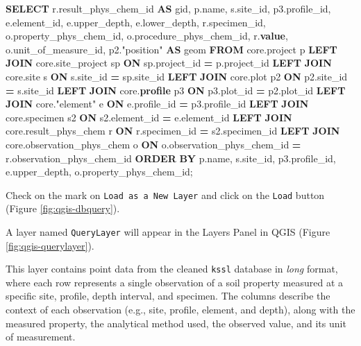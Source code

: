 \documentclass[
  10pt,
  b5paper,
  oneside]{book}
\newenvironment{Shaded}{\begin{snugshade}}{\end{snugshade}}
\newcommand{\FunctionTok}[1]{\textcolor[rgb]{0.13,0.29,0.53}{\textbf{#1}}}
\newcommand{\KeywordTok}[1]{\textcolor[rgb]{0.13,0.29,0.53}{\textbf{#1}}}
\newcommand{\NormalTok}[1]{#1}
\newcommand{\OperatorTok}[1]{\textcolor[rgb]{0.81,0.36,0.00}{\textbf{#1}}}
\newcommand{\OtherTok}[1]{\textcolor[rgb]{0.56,0.35,0.01}{#1}}
\begin{document}
\begin{Shaded}
\begin{Highlighting}[]
\KeywordTok{SELECT} 
\NormalTok{  r.result\_phys\_chem\_id }\KeywordTok{AS}\NormalTok{ gid,}
\NormalTok{  p.name,}
\NormalTok{  s.site\_id,}
\NormalTok{  p3.profile\_id, }
\NormalTok{  e.element\_id,}
\NormalTok{  e.upper\_depth,}
\NormalTok{  e.lower\_depth,}
\NormalTok{  r.specimen\_id,}
\NormalTok{  o.property\_phys\_chem\_id,}
\NormalTok{  o.procedure\_phys\_chem\_id,}
\NormalTok{  r.}\FunctionTok{value}\NormalTok{,}
\NormalTok{  o.unit\_of\_measure\_id,}
\NormalTok{  p2.}\OtherTok{"position"} \KeywordTok{AS}\NormalTok{ geom}
\KeywordTok{FROM}\NormalTok{ core.project p}
\KeywordTok{LEFT} \KeywordTok{JOIN}\NormalTok{ core.site\_project sp }\KeywordTok{ON}\NormalTok{ sp.project\_id }\OperatorTok{=}\NormalTok{ p.project\_id}
\KeywordTok{LEFT} \KeywordTok{JOIN}\NormalTok{ core.site s }\KeywordTok{ON}\NormalTok{ s.site\_id }\OperatorTok{=}\NormalTok{ sp.site\_id}
\KeywordTok{LEFT} \KeywordTok{JOIN}\NormalTok{ core.plot p2 }\KeywordTok{ON}\NormalTok{ p2.site\_id }\OperatorTok{=}\NormalTok{ s.site\_id}
\KeywordTok{LEFT} \KeywordTok{JOIN}\NormalTok{ core.}\KeywordTok{profile}\NormalTok{ p3 }\KeywordTok{ON}\NormalTok{ p3.plot\_id }\OperatorTok{=}\NormalTok{ p2.plot\_id}
\KeywordTok{LEFT} \KeywordTok{JOIN}\NormalTok{ core.}\OtherTok{"element"}\NormalTok{ e }\KeywordTok{ON}\NormalTok{ e.profile\_id }\OperatorTok{=}\NormalTok{ p3.profile\_id}
\KeywordTok{LEFT} \KeywordTok{JOIN}\NormalTok{ core.specimen s2 }\KeywordTok{ON}\NormalTok{ s2.element\_id }\OperatorTok{=}\NormalTok{ e.element\_id}
\KeywordTok{LEFT} \KeywordTok{JOIN}\NormalTok{ core.result\_phys\_chem r }\KeywordTok{ON}\NormalTok{ r.specimen\_id }\OperatorTok{=}\NormalTok{ s2.specimen\_id}
\KeywordTok{LEFT} \KeywordTok{JOIN}\NormalTok{ core.observation\_phys\_chem o }\KeywordTok{ON}\NormalTok{ o.observation\_phys\_chem\_id }\OperatorTok{=}\NormalTok{ r.observation\_phys\_chem\_id}
\KeywordTok{ORDER} \KeywordTok{BY}\NormalTok{ p.name, s.site\_id, p3.profile\_id, e.upper\_depth, o.property\_phys\_chem\_id;}
\end{Highlighting}
\end{Shaded}

Check on the mark on \texttt{Load\ as\ a\ New\ Layer} and click on the \texttt{Load} button (Figure \ref{fig:qgis-dbquery}).

A layer named \texttt{QueryLayer} will appear in the Layers Panel in QGIS (Figure \ref{fig:qgis-querylayer}).

This layer contains point data from the cleaned \texttt{kssl} database in \emph{long} format, where each row represents a single observation of a soil property measured at a specific site, profile, depth interval, and specimen. The columns describe the context of each observation (e.g., site, profile, element, and depth), along with the measured property, the analytical method used, the observed value, and its unit of measurement.
\end{document}
